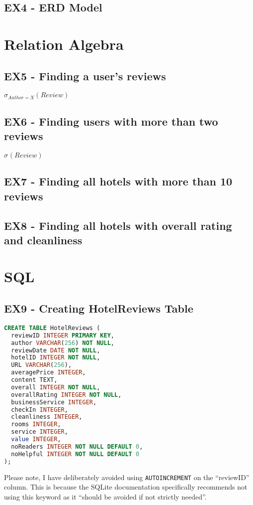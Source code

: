 \documentclass[a4paper]{article}
\begin{document}
\subsection{EX4 - ERD Model}
\begin{center}
\def\svgwidth{\columnwidth}

\end{center}

\section{Relation Algebra}
\subsection{EX5 - Finding a user's reviews}
$\sigma_{Author=X}(Review)$
\subsection{EX6 - Finding users with more than two reviews}
$\sigma_{}(Review)$
\subsection{EX7 - Finding all hotels with more than 10 reviews}
\subsection{EX8 - Finding all hotels with overall rating and cleanliness}

\section{SQL}
\subsection{EX9 - Creating HotelReviews Table}
\begin{lstlisting}[language=SQL, style=default]
CREATE TABLE HotelReviews (
  reviewID INTEGER PRIMARY KEY,
  author VARCHAR(256) NOT NULL,
  reviewDate DATE NOT NULL,
  hotelID INTEGER NOT NULL,
  URL VARCHAR(256),
  averagePrice INTEGER,
  content TEXT,
  overall INTEGER NOT NULL,
  overallRating INTEGER NOT NULL,
  businessService INTEGER,
  checkIn INTEGER,
  cleanliness INTEGER,
  rooms INTEGER,
  service INTEGER,
  value INTEGER,
  noReaders INTEGER NOT NULL DEFAULT 0,
  noHelpful INTEGER NOT NULL DEFAULT 0
);
\end{lstlisting}
Please note, I have deliberately avoided using \texttt{AUTOINCREMENT} on the ``reviewID'' column.
This is because the SQLite documentation specifically recommends not using this keyword as it ``should be avoided if not strictly needed''.
\end{document}
